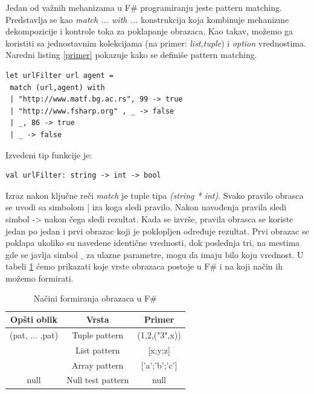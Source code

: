 \documentclass[a4paper]{article}
\begin{document}
Jedan od važnih mehanizama u F\# programiranju jeste pattern matching. Predstavlja se kao {\em match ... with ...} konstrukcija koja kombinuje mehanizme dekompozicije i kontrole toka za poklapanje obrazaca. Kao takav, možemo ga koristiti sa  jednostavnim kolekcijama (na primer: {\em list,tuple}) i {\em option} vrednostima. Naredni listing \ref{primer} pokazuje kako se definiše pattern matching.
\\
\begin{lstlisting}[caption={Primer pattern matching-a \cite{expertFS}},frame=single, label=primer]
let urlFilter url agent =
 match (url,agent) with
 | "http://www.matf.bg.ac.rs", 99 -> true
 | "http://www.fsharp.org" , _ -> false
 | _, 86 -> true
 | _ -> false
\end{lstlisting} 

Izvedeni tip funkcije je: \\

\begin{lstlisting}
val urlFilter: string -> int -> bool
\end{lstlisting}

Izraz nakon ključne reči {\em match} je tuple tipa {\em (string * int)}. Svako pravilo obrasca se uvodi sa simbolom | iza koga sledi pravilo. Nakon navođenja pravila sledi simbol -> nakon čega sledi rezultat. Kada se izvrše, pravila obrasca se koriste jedan po jedan i prvi obrazac koji je poklopljen određuje rezultat. Prvi obrazac se poklapa ukoliko su navedene identične vrednosti, dok poslednja tri, na mestima gde se javlja simbol $\_$ za ulazne parametre, mogu da imaju bilo koju vrednost. U tabeli \ref{tab:tabela1} ćemo prikazati koje vrste obrazaca postoje u F\# i na koji način ih možemo formirati.
 
\begin{table}[h!]
\begin{center}
\caption{Načini formiranja obrazaca u F\#}
\begin{tabular}{|c|c|c|} \hline
\textbf{Opšti oblik}& \textbf{Vrsta}& \textbf{Primer}\\ \hline
(pat, ... ,pat) &Tuple pattern&(1,2,("3",x))
\\ \hline
[pat, ... ,pat] &List pattern&[x;y;z]\\ \hline
[|pat, ... ,pat|] &Array pattern&['a';'b';'c']\\ \hline
null &Null test pattern&null\\ \hline
\end{tabular}
\label{tab:tabela1}
\end{center}
\end{table}
\end{document}
